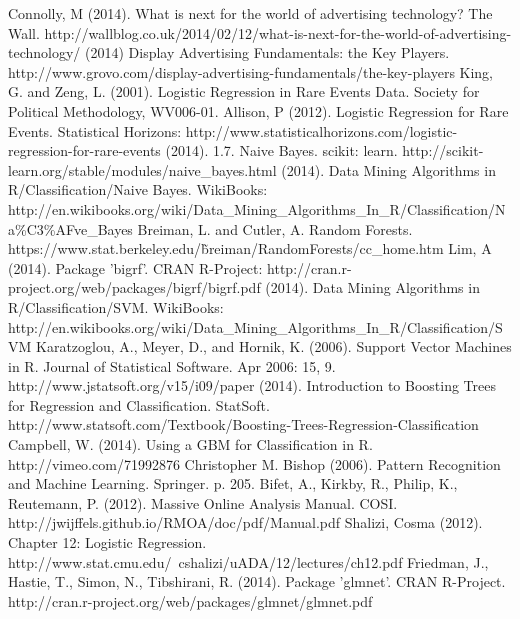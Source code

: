 \documentclass[twoside]{article}
\begin{document}
\begin{multicols}{2}

\begin{thebibliography}{99} %

 Connolly, M (2014). What is next for the world of advertising technology? The Wall. http://wallblog.co.uk/2014/02/12/what-is-next-for-the-world-of-advertising-technology/
 (2014) Display Advertising Fundamentals: the Key Players. http://www.grovo.com/display-advertising-fundamentals/the-key-players
 King, G. and Zeng, L. (2001). Logistic Regression in Rare Events Data. Society for Political Methodology, WV006-01.
 Allison, P (2012). Logistic Regression for Rare Events. Statistical Horizons: http://www.statisticalhorizons.com/logistic-regression-for-rare-events
 (2014). 1.7. Naive Bayes. scikit: learn. http://scikit-learn.org/stable/modules/naive\_bayes.html
 (2014). Data Mining Algorithms in R/Classification/Naive Bayes. WikiBooks: http://en.wikibooks.org/wiki/Data\_Mining\_Algorithms\_In\_R/Classification/Na\%C3\%AFve\_Bayes
 Breiman, L. and Cutler, A. Random Forests. https://www.stat.berkeley.edu/\~breiman/RandomForests/cc\_home.htm
 Lim, A (2014). Package 'bigrf'. CRAN R-Project: http://cran.r-project.org/web/packages/bigrf/bigrf.pdf
 (2014). Data Mining Algorithms in R/Classification/SVM. WikiBooks: http://en.wikibooks.org/wiki/Data\_Mining\_Algorithms\_In\_R/Classification/SVM
 Karatzoglou, A., Meyer, D., and Hornik, K. (2006). Support Vector Machines in R. Journal of Statistical Software. Apr 2006: 15, 9. http://www.jstatsoft.org/v15/i09/paper
 (2014). Introduction to Boosting Trees for Regression and Classification. StatSoft. http://www.statsoft.com/Textbook/Boosting-Trees-Regression-Classification
 Campbell, W. (2014). Using a GBM for Classification in R. http://vimeo.com/71992876
 Christopher M. Bishop (2006). Pattern Recognition and Machine Learning. Springer. p. 205.
 Bifet, A., Kirkby, R., Philip, K., Reutemann, P. (2012). Massive Online Analysis Manual. COSI. http://jwijffels.github.io/RMOA/doc/pdf/Manual.pdf
 Shalizi, Cosma (2012). Chapter 12: Logistic Regression. http://www.stat.cmu.edu/~cshalizi/uADA/12/lectures/ch12.pdf
 Friedman, J., Hastie, T., Simon, N., Tibshirani, R. (2014). Package 'glmnet'. CRAN R-Project. http://cran.r-project.org/web/packages/glmnet/glmnet.pdf

\end{thebibliography}
\end{multicols}
\end{document}
